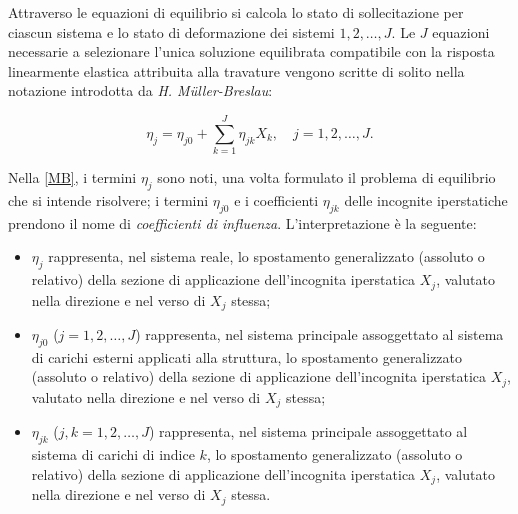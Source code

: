 Attraverso le equazioni di
equilibrio si calcola lo stato di sollecitazione  per ciascun sistema e lo stato di deformazione dei sistemi  $1, 2, \ldots, J$. Le  $J$ equazioni necessarie a selezionare l’unica soluzione equilibrata compatibile con la risposta linearmente elastica attribuita alla travature vengono scritte di solito nella notazione introdotta da \textit{H. M\"{u}ller-Breslau}:
\begin{definition}
	\begin{equation}\label{MB}
	\eta_j=\eta_{j0}+\sum_{k=1}^J\eta_{jk}X_k,\quad j=1,2,\ldots,J.
\end{equation}
\end{definition}

Nella \eqref{MB}, i termini $\eta_j$ sono noti, una volta formulato il problema di equilibrio che si intende risolvere; i termini $\eta_{j0}$ e i coefficienti $\eta_{jk}$ delle incognite iperstatiche prendono il nome di \textit{coefficienti di influenza}. L'interpretazione è la seguente:
\begin{itemize}
	\item $\eta_j$ rappresenta, nel sistema reale, lo spostamento generalizzato (assoluto o relativo) della sezione di applicazione dell’incognita iperstatica $X_j$, valutato nella direzione e nel verso di $X_j$ stessa;
	\item $\eta_{j0}$ ($j=1,2,\ldots,J$) rappresenta, nel sistema principale assoggettato al sistema di carichi esterni applicati alla struttura, lo spostamento generalizzato (assoluto o relativo) della sezione di applicazione dell’incognita iperstatica $X_j$, valutato nella direzione e nel verso di $X_j$ stessa;
	\item $\eta_{jk}$ ($j,k=1,2,\ldots,J$) rappresenta, nel sistema principale assoggettato al sistema di carichi di indice $k$, lo spostamento generalizzato (assoluto o relativo) della sezione di applicazione dell’incognita iperstatica $X_j$, valutato nella direzione e nel verso di $X_j$ stessa.
\end{itemize}

